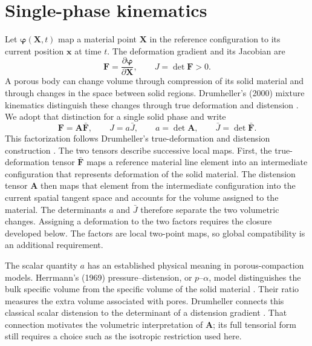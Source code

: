 \documentclass[11pt]{article}
\newcommand{\mbf}[1]{\mathbf{#1}}
\newcommand{\bs}[1]{\boldsymbol{#1}}
\begin{document}
\section{Single-phase kinematics}
\label{sec:kinematics}

Let \(\bs\varphi(\mbf X,t)\) map a material point \(\mbf X\) in the reference
configuration to its current position \(\mbf x\) at time \(t\). The deformation gradient
and its Jacobian are
\begin{equation*}
	\mbf F=\frac{\partial\bs\varphi}{\partial\mbf X},
	\qquad
	J=\det\mbf F>0.
\end{equation*}
A porous body can change volume through compression of its solid material
and through changes in the space between solid regions. Drumheller's (2000)
mixture kinematics distinguish these changes through true deformation and
distension \cite[Secs.~3--4]{drumheller2000}. We adopt that distinction for a
single solid phase and write
\begin{equation}
	\mbf F=\mbf A\bar{\mbf F},
	\qquad
	J=a\bar J,
	\qquad
	a=\det\mbf A,
	\qquad
	\bar J=\det\bar{\mbf F}.
	\label{eq:distension_split}
\end{equation}
This factorization follows Drumheller's true-deformation and distension
construction \cite[Secs.~3 and 8.2]{drumheller2000}. The two tensors describe
successive local maps. First, the true-deformation tensor \(\bar{\mbf F}\) maps
a reference material line element into an intermediate configuration that
represents deformation of the solid material. The distension tensor \(\mbf A\)
then maps that element from the intermediate configuration into the current
spatial tangent space and accounts for the volume assigned to the material.
The determinants \(a\) and \(\bar J\) therefore separate the two volumetric
changes. Assigning a deformation to the two factors requires the closure
developed below. The factors are local two-point maps, so global compatibility
is an additional requirement.

The scalar quantity \(a\) has an established physical meaning in
porous-compaction models. Herrmann's (1969) pressure--distension, or
\(p\)--\(\alpha\), model distinguishes the bulk specific volume from the
specific volume of the solid material \cite{herrmann1969}. Their ratio measures
the extra volume associated with pores. Drumheller connects this classical
scalar distension to the determinant of a distension gradient
\cite[Sec.~4]{drumheller2000}. That connection motivates the volumetric
interpretation of \(\mbf A\); its full tensorial form still requires a choice
such as the isotropic restriction used here.
\end{document}
